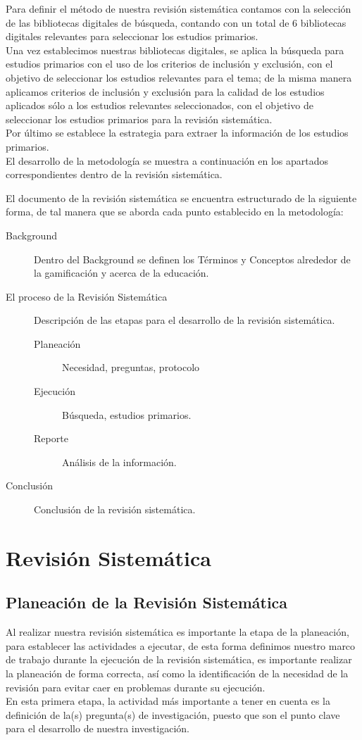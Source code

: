 \documentclass{report}
\begin{document}
	Para definir el método de nuestra revisión sistemática contamos con la selección de las bibliotecas digitales de búsqueda, contando con un total de 6 bibliotecas digitales relevantes para seleccionar los estudios primarios.\\
	Una vez establecimos nuestras bibliotecas digitales, se aplica la búsqueda para estudios primarios con el uso de los criterios de inclusión y exclusión, con el objetivo de seleccionar los estudios relevantes para el tema; de la misma manera aplicamos criterios de inclusión y exclusión para la calidad de los estudios aplicados sólo a los estudios relevantes seleccionados, con el objetivo de seleccionar los estudios primarios para la revisión sistemática.\\
	Por último se establece la estrategia para extraer la información de los estudios primarios.\\
	El desarrollo de la metodología se muestra a continuación en los apartados correspondientes dentro de la revisión sistemática.
	
	El documento de la revisión sistemática se encuentra estructurado de la siguiente forma, de tal manera que se aborda cada punto establecido en la metodología:
	\begin{description}
		\item[Background] Dentro del Background se definen los Términos y Conceptos alrededor de la gamificación y acerca de la educación.
		\item[El proceso de la Revisión Sistemática] Descripción de las etapas para el desarrollo de la revisión sistemática.
		\begin{description}
			\item[Planeación] Necesidad, preguntas, protocolo
			\item[Ejecución] Búsqueda, estudios primarios.
			\item[Reporte] Análisis de la información.
		\end{description}
		\item[Conclusión] Conclusión de la revisión sistemática.
	\end{description}    
    		
\chapter{Revisión Sistemática}
	\section{Planeación de la Revisión Sistemática}
	Al realizar nuestra revisión sistemática es importante la etapa de la planeación, para establecer las actividades a ejecutar, de esta forma definimos nuestro marco de trabajo durante la ejecución de la revisión sistemática, es importante realizar la planeación de forma correcta, así como la identificación de la necesidad de la revisión para evitar caer en problemas durante su ejecución.\\
	En esta primera etapa, la actividad más importante a tener en cuenta es la definición de la(s) pregunta(s) de investigación, puesto que son el punto clave para el desarrollo de nuestra investigación.
\end{document}
